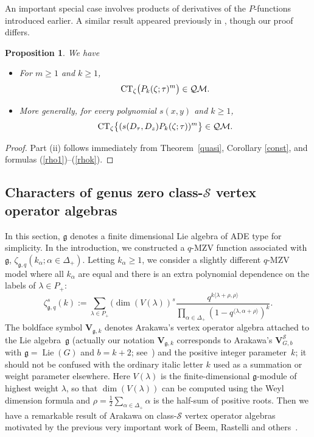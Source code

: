 \documentclass[10pt,a4paper]{amsart}
\numberwithin{equation}{section}
\newtheorem{Proposition}[Theorem]{Proposition}
\theoremstyle{definition}
\begin{document}
An important special case involves products of derivatives of the $P$-functions introduced earlier.
A similar result appeared previously in \cite[Proposition~5.9]{GM}, though our proof differs.

\begin{Proposition} \label{P-power} We have
\begin{itemize}\itemsep=0pt
\item[$(i)$] For $m \geq 1$ and $k \geq 1$,
\[
{\rm CT}_{\zeta} \bigl(P_k(\zeta;\tau)^m \bigr) \in \mathcal{QM}.
\]
\item[$(ii)$] More generally, for every polynomial $s(x,y)$ and $k \geq 1$,
\[
{\rm CT}_{\zeta} \bigl\{ (s(D_\tau,D_{z}) P_k(\zeta;\tau))^{m} \bigr\} \in \mathcal{QM}.
\]
\end{itemize}
\end{Proposition}
\begin{proof} Part (ii) follows immediately from Theorem~\ref{quasi}, Corollary \ref{const}, and formulas (\ref{rho1})--(\ref{rhok}).
\end{proof}

\subsection[Characters of genus zero class-S vertex operator algebras]{Characters of genus zero class-$\boldsymbol{\mathcal{S}}$ vertex operator algebras}\label{section3.3}

In this section, $\mathfrak{g}$ denotes a finite dimensional Lie algebra of ADE type for simplicity. In the introduction, we
constructed a $q$-MZV function associated with $\mathfrak{g}$, $\zeta_{\mathfrak{g},q}(k_{\alpha}; \alpha \in \Delta_+)$. Letting $k_{\alpha} \geq 1$, we consider a slightly different $q$-MZV model where all $k_{\alpha}$ are equal and
there is an extra polynomial dependence on the labels of $\lambda \in P_+$:
\[
\zeta_{\mathfrak{g},q}^{s}(k):=\sum_{\lambda \in P_+} (\dim (V(\lambda))^{s} \frac{q^{k \langle\lambda+\rho,\rho\rangle}}{\prod_{\alpha \in \Delta_+} (1-q^{\langle \lambda, \alpha+\rho\rangle})^{k}}.
\]
The boldface symbol $\mathbf{V}_{\mathfrak g,k}$ denotes Arakawa's vertex operator algebra attached to the Lie algebra~$\mathfrak g$ (actually our notation $\mathbf V_{\mathfrak g,k}$ corresponds to Arakawa's $\mathbf V^{\mathcal S}_{G,b}$ with $\mathfrak g=
\operatorname{Lie}(G)$ and $b=k+2$; see~\cite{Arakawa})
and the positive integer parameter~$k$; it should not be confused with the ordinary italic letter $k$ used as a summation or weight parameter elsewhere.
Here $V(\lambda)$ is the finite-dimensional $\mathfrak{g}$-module of highest weight $\lambda$, so that $\dim (V(\lambda))$ can be computed using the Weyl dimension formula and $\rho=\frac12 \sum_{\alpha \in \Delta_+} \alpha$ is the half-sum of positive roots. Then we have a remarkable result of Arakawa on class-$\mathcal{S}$ vertex operator algebras motivated by the previous very important work of Beem, Rastelli and others~\cite{BR,Beem}.
\end{document}
